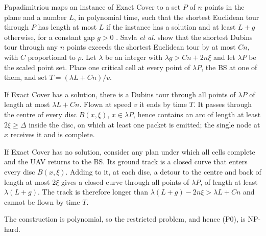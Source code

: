 Papadimitriou \cite{papadimitriou1977} maps an instance of Exact Cover to a set $P$ of $n$ points in the plane and a
number $L$, in polynomial time, such that the shortest Euclidean tour through $P$ has length at most $L$ if the instance
has a solution and at least $L+g$ otherwise, for a constant gap $g>0$ \cite{leny2012}. Savla \emph{et al.}
\cite{savla2008} show that the shortest Dubins tour through any $n$ points exceeds the shortest Euclidean tour by at most
$Cn$, with $C$ proportional to $\rho$. Let $\lambda$ be an integer with $\lambda g>Cn+2n\xi$ and let $\lambda P$ be the
scaled point set. Place one critical cell at every point of $\lambda P$, the BS at one of them, and set
$T=(\lambda L+Cn)/v$.

If Exact Cover has a solution, there is a Dubins tour through all points of $\lambda P$ of length at most
$\lambda L+Cn$. Flown at speed $v$ it ends by time $T$. It passes through the centre of every disc $B(x,\xi)$,
$x\in\lambda P$, hence contains an arc of length at least $2\xi\ge\Delta$ inside the disc, on which at least one packet is
emitted; the single node at $x$ receives it and is complete.

If Exact Cover has no solution, consider any plan under which all cells complete and the UAV returns to the BS. Its
ground track is a closed curve that enters every disc $B(x,\xi)$. Adding to it, at each disc, a detour to the centre and
back of length at most $2\xi$ gives a closed curve through all points of $\lambda P$, of length at least
$\lambda(L+g)$. The track is therefore longer than $\lambda(L+g)-2n\xi>\lambda L+Cn$ and cannot be flown by time $T$.

The construction is polynomial, so the restricted problem, and hence (P0), is NP-hard. \hfill\IEEEQED


